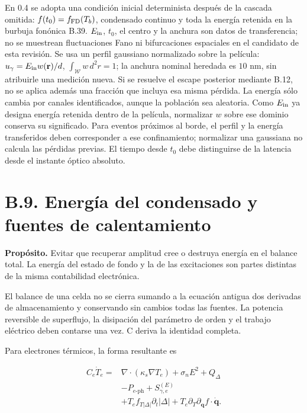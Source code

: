 \documentclass[
  spanish,
  10pt,
  a4paper,
]{article}
\begin{document}
En 0.4 se adopta una condición inicial determinista después de la
cascada omitida: \(f(t_0)=f_{\rm FD}(T_b)\), condensado continuo y toda
la energía retenida en la burbuja fonónica B.39. \(E_{\rm in}\),
\(t_0\), el centro y la anchura son datos de transferencia; no se
muestrean fluctuaciones Fano ni bifurcaciones espaciales en el candidato
de esta revisión. Se usa un perfil gaussiano normalizado sobre la
película: \(u_\gamma=E_{\rm in}w(\mathbf r)/d\),
\(\int_{\mathcal W}w\,d^2r=1\); la anchura nominal heredada es \(10\)
nm, sin atribuirle una medición nueva. Si se resuelve el escape
posterior mediante B.12, no se aplica además una fracción que incluya
esa misma pérdida. La energía sólo cambia por canales identificados,
aunque la población sea aleatoria. Como \(E_{\rm in}\) ya designa
energía retenida dentro de la película, normalizar \(w\) sobre ese
dominio conserva su significado. Para eventos próximos al borde, el
perfil y la energía transferidos deben corresponder a ese confinamiento;
normalizar una gaussiana no calcula las pérdidas previas. El tiempo
desde \(t_0\) debe distinguirse de la latencia desde el instante óptico
absoluto.

\section{B.9. Energía del condensado y fuentes de
calentamiento}\label{b.9.-energuxeda-del-condensado-y-fuentes-de-calentamiento}

\textbf{Propósito.} Evitar que recuperar amplitud cree o destruya
energía en el balance total. La energía del estado de fondo y la de las
excitaciones son partes distintas de la misma contabilidad electrónica.

El balance de una celda no se cierra sumando a la ecuación antigua dos
derivadas de almacenamiento y conservando sin cambios todas las fuentes.
La potencia reversible de superflujo, la disipación del parámetro de
orden y el trabajo eléctrico deben contarse una vez. C deriva la
identidad completa.

Para electrones térmicos, la forma resultante es

\[
\begin{aligned}
C_e\dot T_e={}&\nabla\cdot(\kappa_s\nabla T_e)
+\sigma_nE^2+Q_\Delta\\
&-P_{e\text{-ph}}+S_{\gamma,e}^{(E)}\\
&+T_e f_{T|\Delta|}\partial_t|\Delta|+T_e\partial_T\partial_{\mathbf q}f\cdot\dot{\mathbf q}.
\end{aligned}
\tag{B.40}
\]
\end{document}
